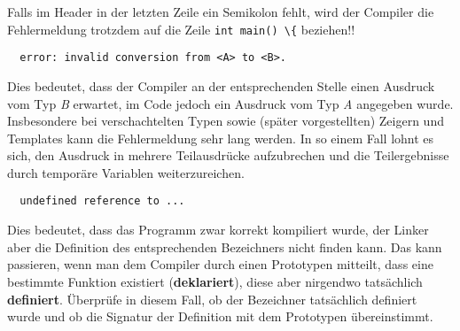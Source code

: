 Falls im Header  in der letzten Zeile ein Semikolon fehlt, wird der Compiler die Fehlermeldung trotzdem auf die Zeile \lstinline{int main() \{} beziehen!!

\begin{verbatim}
  error: invalid conversion from <A> to <B>.
\end{verbatim}

Dies bedeutet, dass der Compiler an der entsprechenden Stelle einen Ausdruck vom Typ \emph{B} erwartet, im Code jedoch ein Ausdruck vom Typ \emph{A} angegeben wurde. Insbesondere bei verschachtelten Typen sowie (später vorgestellten) Zeigern und Templates kann die Fehlermeldung sehr lang werden. In so einem Fall lohnt es sich, den Ausdruck in mehrere Teilausdrücke aufzubrechen und die Teilergebnisse durch temporäre Variablen weiterzureichen.

\begin{verbatim}
  undefined reference to ...
\end{verbatim}

Dies bedeutet, dass das Programm zwar korrekt kompiliert wurde, der Linker aber die Definition des entsprechenden Bezeichners nicht finden kann.
Das kann passieren, wenn man dem Compiler durch einen Prototypen mitteilt, dass eine bestimmte Funktion existiert (\textbf{deklariert}), diese aber nirgendwo tatsächlich \textbf{definiert}.
Überprüfe in diesem Fall, ob der Bezeichner tatsächlich definiert wurde und ob die Signatur der Definition mit dem Prototypen übereinstimmt.


\setlength{\leftskip}{0pt}
